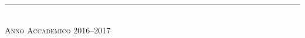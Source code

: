 \begin{titlepage}
\begin{center}
{\begin{minipage}[t]{0.45\textwidth}
\end{minipage}

}

\vspace{2\baselineskip}


\vfil \vfil \vfil

\rule{\textwidth}{1pt}\\
{\scshape Anno Accademico 2016--2017}

\end{center}
\end{titlepage}